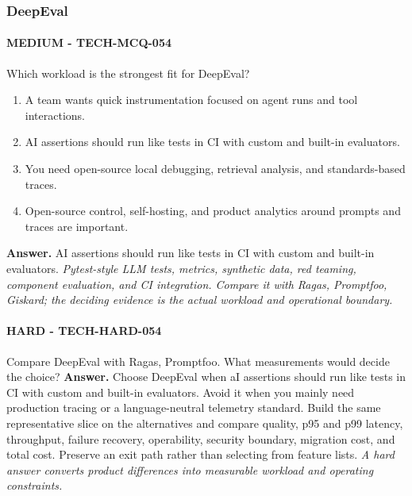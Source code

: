 \subsubsection*{DeepEval}
\paragraph{MEDIUM - TECH-MCQ-054} Which workload is the strongest fit for DeepEval?
\begin{enumerate}[label=\Alph*.]
\item A team wants quick instrumentation focused on agent runs and tool interactions.
\item AI assertions should run like tests in CI with custom and built-in evaluators.
\item You need open-source local debugging, retrieval analysis, and standards-based traces.
\item Open-source control, self-hosting, and product analytics around prompts and traces are important.
\end{enumerate}
\textbf{Answer.} AI assertions should run like tests in CI with custom and built-in evaluators.
\textit{Pytest-style LLM tests, metrics, synthetic data, red teaming, component evaluation, and CI integration. Compare it with Ragas, Promptfoo, Giskard; the deciding evidence is the actual workload and operational boundary.}
\paragraph{HARD - TECH-HARD-054} Compare DeepEval with Ragas, Promptfoo. What measurements would decide the choice?
\textbf{Answer.} Choose DeepEval when aI assertions should run like tests in CI with custom and built-in evaluators. Avoid it when you mainly need production tracing or a language-neutral telemetry standard. Build the same representative slice on the alternatives and compare quality, p95 and p99 latency, throughput, failure recovery, operability, security boundary, migration cost, and total cost. Preserve an exit path rather than selecting from feature lists.
\textit{A hard answer converts product differences into measurable workload and operating constraints.}
